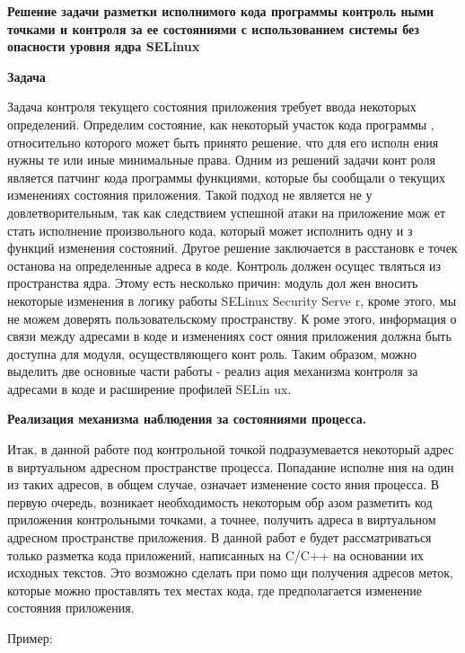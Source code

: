 
{\bfseries Решение задачи разметки исполнимого кода программы контроль
ными точками и контроля за ее состояниями с использованием системы без
опасности уровня ядра SELinux}

\bigskip 
{\bfseries Задача} 

Задача контроля текущего состояния приложения требует ввода некоторых 
определений. Определим состояние, как некоторый участок кода программы
, относительно которого может быть принято решение, что для его исполн
ения нужны те или иные минимальные права. Одним из решений задачи конт
роля является патчинг кода программы функциями, которые бы сообщали о 
текущих изменениях состояния приложения. Такой подход не является не у
довлетворительным, так как следствием успешной атаки на приложение мож
ет стать исполнение произвольного кода, который может исполнить одну и
з функций изменения состояний. Другое решение заключается в расстановк
е точек останова на определенные адреса в коде. Контроль должен осущес
твляться из пространства ядра. Этому есть несколько причин: модуль дол
жен вносить некоторые изменения в логику работы SELinux Security Serve
r, кроме этого, мы не можем доверять пользовательскому пространству. К
роме этого, информация о связи между адресами в коде и изменениях сост
ояния приложения должна быть доступна для модуля, осуществляющего конт
роль. Таким образом, можно выделить две основные части работы - реализ
ация механизма контроля за адресами в коде и расширение профилей SELin
ux.

\bigskip 
{\bfseries Реализация механизма наблюдения за состояниями процесса.}

Итак, в данной работе под контрольной точкой подразумевается некоторый
 адрес в виртуальном адресном пространстве процесса. Попадание исполне
ния на один из таких адресов, в общем случае, означает изменение состо
яния процесса. В первую очередь, возникает необходимость некоторым обр
азом разметить код приложения контрольными точками, а точнее, получить
 адреса в виртуальном адресном пространстве приложения. В данной работ
е будет рассматриваться только разметка кода приложений, написанных на
 C/C++ на основании их исходных текстов. Это возможно сделать при помо
щи получения адресов меток, которые можно проставлять тех местах кода,
 где предполагается изменение состояния приложения. 

Пример: 

